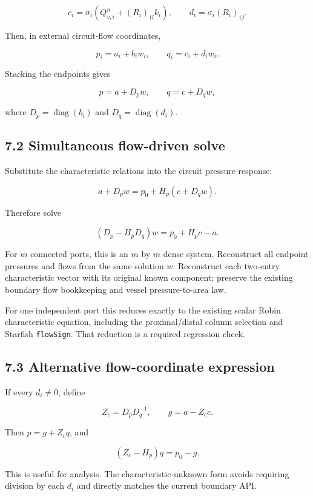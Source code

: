 \documentclass[11pt,a4paper]{article}
\begin{document}
\nopagebreak[3]
\[
c_i=\sigma_i\left(Q^n_{v,i}+(R_i)_{1l}k_i\right),
\qquad d_i=\sigma_i(R_i)_{1j}.
\]


Then, in external circuit-flow coordinates,


\nopagebreak[3]
\[
p_i=a_i+b_iw_i,\qquad q_i=c_i+d_iw_i.
\]


Stacking the endpoints gives


\nopagebreak[3]
\[
p=a+D_pw,\qquad q=c+D_qw,
\]


where \(D_p=\operatorname{diag}(b_i)\) and \(D_q=\operatorname{diag}(d_i)\).

\subsection{7.2 Simultaneous flow-driven solve}
Substitute the characteristic relations into the circuit pressure response:


\nopagebreak[3]
\[
a+D_pw=p_0+H_p(c+D_qw).
\]


Therefore solve


\nopagebreak[3]
\[
\boxed{(D_p-H_pD_q)w=p_0+H_pc-a.}
\]


For \(m\) connected ports, this is an \(m\) by \(m\) dense system. Reconstruct all endpoint pressures and flows from the same solution \(w\). Reconstruct each two-entry characteristic vector with its original known component; preserve the existing boundary flow bookkeeping and vessel pressure-to-area law.

For one independent port this reduces exactly to the existing scalar Robin characteristic equation, including the proximal/distal column selection and Starfish \texttt{flow\allowbreak{}Sign}. That reduction is a required regression check.

\subsection{7.3 Alternative flow-coordinate expression}
If every \(d_i\ne0\), define


\nopagebreak[3]
\[
Z_c=D_pD_q^{-1},\qquad g=a-Z_cc.
\]


Then \(p=g+Z_cq\), and


\nopagebreak[3]
\[
(Z_c-H_p)q=p_0-g.
\]


This is useful for analysis. The characteristic-unknown form avoids requiring division by each \(d_i\) and directly matches the current boundary API.

\end{document}
